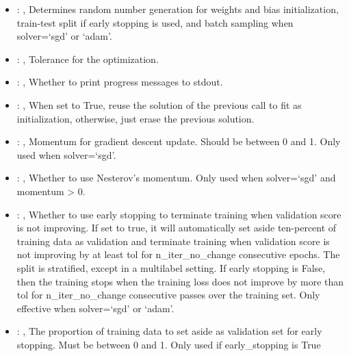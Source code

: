 \begin{itemize}
    \item {}: , 
      Determines random number generation for weights and bias initialization,
      train-test split if early stopping is used, and batch sampling when solver=`sgd' or `adam'.

    \item {}: , 
      Tolerance for the optimization.

    \item {}: , 
      Whether to print progress messages to stdout.

    \item {}: , 
      When set to True, reuse the solution of the previous call to fit as initialization, otherwise,
      just erase the previous solution.

    \item {}: , 
      Momentum for gradient descent update. Should be between 0 and 1. Only used when solver=`sgd'.

    \item {}: , 
      Whether to use Nesterov's momentum. Only used when solver=`sgd' and momentum > 0.

    \item {}: , 
      Whether to use early stopping to terminate training when validation score is not improving.
      If set to true, it will automatically set aside ten-percent of training data as validation and
      terminate                                                  training when validation score is
      not improving by at least tol for n\_iter\_no\_change consecutive
      epochs. The split is stratified, except in a multilabel setting. If early stopping is False,
      then                                                  the training stops when the training
      loss does not improve by more than tol for n\_iter\_no\_change
      consecutive passes over the training set. Only effective when solver=`sgd' or `adam'.

    \item {}: , 
      The proportion of training data to set aside as validation set for early stopping. Must be
      between 0 and 1.                                                  Only used if early\_stopping
      is True


\end{itemize}

